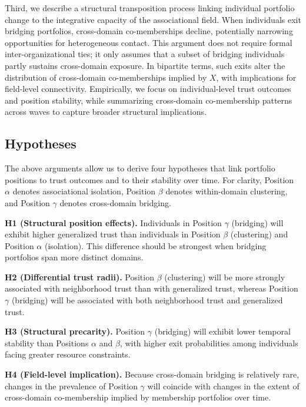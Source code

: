 Third, we describe a structural transposition process linking individual portfolio change to the integrative capacity of the associational field. When individuals exit bridging portfolios, cross-domain co-memberships decline, potentially narrowing opportunities for heterogeneous contact. This argument does not require formal inter-organizational ties; it only assumes that a subset of bridging individuals partly sustains cross-domain exposure. In bipartite terms, such exits alter the distribution of cross-domain co-memberships implied by $X$, with implications for field-level connectivity. Empirically, we focus on individual-level trust outcomes and position stability, while summarizing cross-domain co-membership patterns across waves to capture broader structural implications.


\subsection{Hypotheses}

The above arguments allow us to derive four hypotheses that link portfolio positions to trust outcomes and to their stability over time. For clarity, Position $\alpha$ denotes associational isolation, Position $\beta$ denotes within-domain clustering, and Position $\gamma$ denotes cross-domain bridging.


\textbf{H1 (Structural position effects).} Individuals in Position $\gamma$ (bridging) will exhibit higher generalized trust than individuals in Position $\beta$ (clustering) and Position $\alpha$ (isolation). This difference should be strongest when bridging portfolios span more distinct domains.

\textbf{H2 (Differential trust radii).} Position $\beta$ (clustering) will be more strongly associated with neighborhood trust than with generalized trust, whereas Position $\gamma$ (bridging) will be associated with both neighborhood trust and generalized trust.

\textbf{H3 (Structural precarity).} Position $\gamma$ (bridging) will exhibit lower temporal stability than Positions $\alpha$ and $\beta$, with higher exit probabilities among individuals facing greater resource constraints.

\textbf{H4 (Field-level implication).} Because cross-domain bridging is relatively rare, changes in the prevalence of Position $\gamma$ will coincide with changes in the extent of cross-domain co-membership implied by membership portfolios over time.


